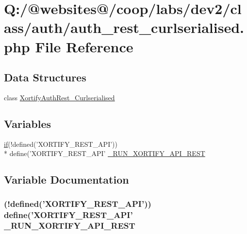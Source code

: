 \hypertarget{auth__rest__curlserialised_8php}{\section{Q\-:/@websites@/coop/labs/dev2/class/auth/auth\-\_\-rest\-\_\-curlserialised.php File Reference}
\label{auth__rest__curlserialised_8php}
}
\subsection*{Data Structures}
\begin{DoxyCompactItemize}
\item 
class \hyperlink{class_xortify_auth_rest___curlserialised}{Xortify\-Auth\-Rest\-\_\-\-Curlserialised}
\end{DoxyCompactItemize}
\subsection*{Variables}
\begin{DoxyCompactItemize}
\item 
\hyperlink{index_8php_ae2ccdf355624402b65fc2226f2a661cd}{if}(!defined('X\-O\-R\-T\-I\-F\-Y\-\_\-\-R\-E\-S\-T\-\_\-\-A\-P\-I')) \\*
define('X\-O\-R\-T\-I\-F\-Y\-\_\-\-R\-E\-S\-T\-\_\-\-A\-P\-I' \hyperlink{auth__rest__curlserialised_8php_a731f04083e48e3087b2f5cad38672473}{\-\_\-\-R\-U\-N\-\_\-\-X\-O\-R\-T\-I\-F\-Y\-\_\-\-A\-P\-I\-\_\-\-R\-E\-S\-T}
\end{DoxyCompactItemize}


\subsection{Variable Documentation}
\hypertarget{auth__rest__curlserialised_8php_a731f04083e48e3087b2f5cad38672473}{
\subsubsection[{\-\_\-\-R\-U\-N\-\_\-\-X\-O\-R\-T\-I\-F\-Y\-\_\-\-A\-P\-I\-\_\-\-R\-E\-S\-T}]{ (!defined('X\-O\-R\-T\-I\-F\-Y\-\_\-\-R\-E\-S\-T\-\_\-\-A\-P\-I')) define('X\-O\-R\-T\-I\-F\-Y\-\_\-\-R\-E\-S\-T\-\_\-\-A\-P\-I' \-\_\-\-R\-U\-N\-\_\-\-X\-O\-R\-T\-I\-F\-Y\-\_\-\-A\-P\-I\-\_\-\-R\-E\-S\-T}}\label{auth__rest__curlserialised_8php_a731f04083e48e3087b2f5cad38672473}
